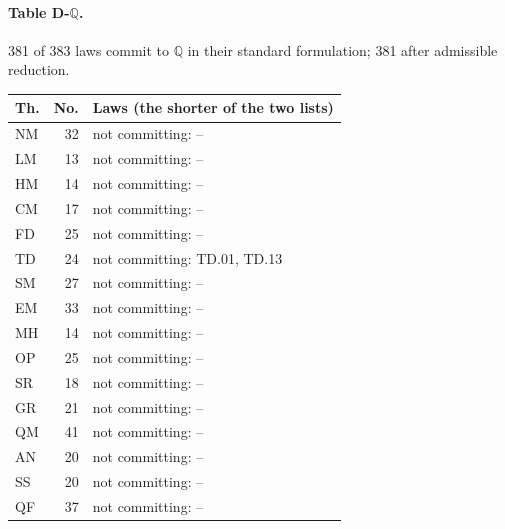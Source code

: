 \paragraph{Table D-$\mathbb Q$.} 381 of 383 laws commit to $\mathbb Q$ in their standard formulation; 381 after admissible reduction.
{\scriptsize\setlength{\tabcolsep}{3pt}
\begin{longtable}{l r p{12.2cm}}
\toprule
Th. & No. & Laws (the shorter of the two lists) \\
\midrule
\endhead
\bottomrule\endfoot
NM & 32 & not committing: -- \\
LM & 13 & not committing: -- \\
HM & 14 & not committing: -- \\
CM & 17 & not committing: -- \\
FD & 25 & not committing: -- \\
TD & 24 & not committing: TD.01, TD.13 \\
SM & 27 & not committing: -- \\
EM & 33 & not committing: -- \\
MH & 14 & not committing: -- \\
OP & 25 & not committing: -- \\
SR & 18 & not committing: -- \\
GR & 21 & not committing: -- \\
QM & 41 & not committing: -- \\
AN & 20 & not committing: -- \\
SS & 20 & not committing: -- \\
QF & 37 & not committing: -- \\
\end{longtable}
}
